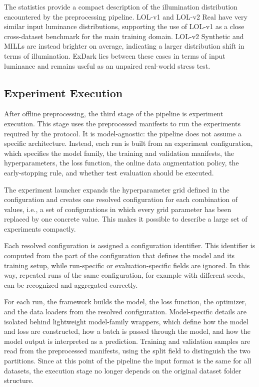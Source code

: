 

The statistics provide a compact description of the illumination distribution encountered by the preprocessing pipeline. LOL-v1 and LOL-v2 Real have very similar input luminance distributions, supporting the use of LOL-v1 as a close cross-dataset benchmark for the main training domain. LOL-v2 Synthetic and MILLs are instead brighter on average, indicating a larger distribution shift in terms of illumination. ExDark lies between these cases in terms of input luminance and remains useful as an unpaired real-world stress test.

\subsection{Experiment Execution}
\label{sec:experiment_execution}

After offline preprocessing, the third stage of the pipeline is experiment execution. This stage uses the preprocessed manifests to run the experiments required by the protocol. It is model-agnostic: the pipeline does not assume a specific architecture. Instead, each run is built from an experiment configuration, which specifies the model family, the training and validation manifests, the hyperparameters, the loss function, the online data augmentation policy, the early-stopping rule, and whether test evaluation should be executed.

The experiment launcher expands the hyperparameter grid defined in the configuration and creates one resolved configuration for each combination of values, i.e., a set of configurations in which every grid parameter has been replaced by one concrete value. This makes it possible to describe a large set of experiments compactly.

Each resolved configuration is assigned a configuration identifier. This identifier is computed from the part of the configuration that defines the model and its training setup, while run-specific or evaluation-specific fields are ignored. In this way, repeated runs of the same configuration, for example with different seeds, can be recognized and aggregated correctly.

For each run, the framework builds the model, the loss function, the optimizer, and the data loaders from the resolved configuration. Model-specific details are isolated behind lightweight model-family wrappers, which define how the model and loss are constructed, how a batch is passed through the model, and how the model output is interpreted as a prediction. Training and validation samples are read from the preprocessed manifests, using the split field to distinguish the two partitions. Since at this point of the pipeline the input format is the same for all datasets, the execution stage no longer depends on the original dataset folder structure.

